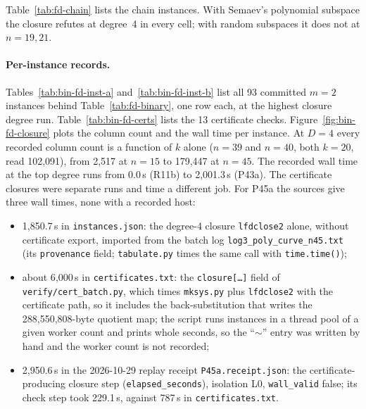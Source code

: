 Table~\ref{tab:fd-chain} lists the chain instances. With Semaev's
polynomial subspace the closure refutes at degree~4 in every cell; with
random subspaces it does not at $n=19,21$.

\begin{table}[t]
\centering\small

\caption[]{Chained system, $m=t=3$, $k=\lceil n/3\rceil$: closure at $D=4$
per instance. ``$\le4$'' means $1\in W_4$; ``$\ge5$'' means $1\notin W_4$.
Certified codimensions as in Table~\ref{tab:fd-binary}; C21a and C21b have
no checked certificate: $1\notin W_4$ by implementation~A alone. Source:
.}
\label{tab:fd-chain}
\end{table}

\paragraph{Per-instance records.} Tables~\ref{tab:bin-fd-inst-a}
and~\ref{tab:bin-fd-inst-b} list all 93 committed $m=2$ instances behind
Table~\ref{tab:fd-binary}, one row each, at the highest closure degree run.
Table~\ref{tab:bin-fd-certs} lists the 13 certificate checks.
Figure~\ref{fig:bin-fd-closure} plots the column count and the wall time per
instance. At $D=4$ every recorded column count is a function of $k$ alone
($n=39$ and $n=40$, both $k=20$, read 102{,}091), from 2{,}517 at $n=15$ to
179{,}447 at $n=45$. The recorded wall time at the top degree runs from
0.0\,s (R11b) to 2{,}001.3\,s (P43a). The certificate closures were
separate runs and time a different job. For P45a the sources give three
wall times, none with a recorded host:
\begin{itemize}
\item 1{,}850.7\,s in \texttt{instances.json}: the degree-4 closure
  \texttt{lfdclose2} alone, without certificate export, imported from the
  batch log \texttt{log3\_poly\_curve\_n45.txt} (its \texttt{provenance}
  field; \texttt{tabulate.py} times the same call with \texttt{time.time()});
\item about 6{,}000\,s in \texttt{certificates.txt}: the
  \texttt{closure[\ldots]} field of \texttt{verify/cert\_batch.py}, which
  times \texttt{mksys.py} plus \texttt{lfdclose2} with the certificate
  path, so it includes the back-substitution that writes the 288{,}550{,}808-byte quotient
  map; the script runs instances in a thread pool of a given worker count and
  prints whole seconds, so the ``$\sim$'' entry was written by hand and the
  worker count is not recorded;
\item 2{,}950.6\,s in the 2026-10-29 replay receipt
  \texttt{P45a.receipt.json}: the certificate-producing closure step
  (\texttt{elapsed\_seconds}), isolation L0, \texttt{wall\_valid} false;
  its check step took 229.1\,s, against 787\,s in
  \texttt{certificates.txt}.
\end{itemize}
